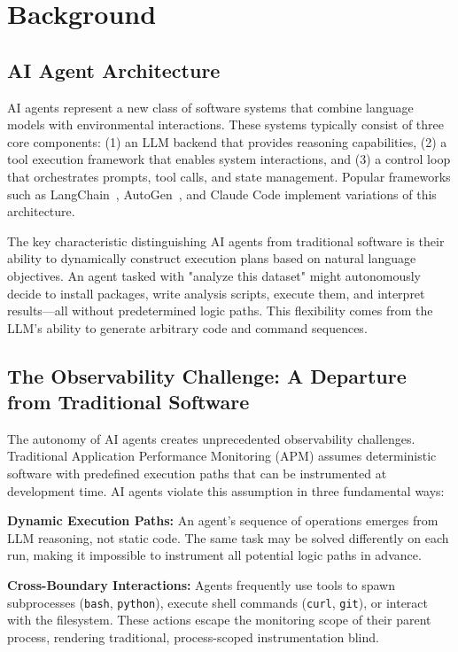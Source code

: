 \section{Background}

\subsection{AI Agent Architecture}

AI agents represent a new class of software systems that combine language models with environmental interactions. These systems typically consist of three core components: (1) an LLM backend that provides reasoning capabilities, (2) a tool execution framework that enables system interactions, and (3) a control loop that orchestrates prompts, tool calls, and state management. Popular frameworks such as LangChain~\cite{langchain}, AutoGen~\cite{autogen}, and Claude Code implement variations of this architecture.

The key characteristic distinguishing AI agents from traditional software is their ability to dynamically construct execution plans based on natural language objectives. An agent tasked with "analyze this dataset" might autonomously decide to install packages, write analysis scripts, execute them, and interpret results—all without predetermined logic paths. This flexibility comes from the LLM's ability to generate arbitrary code and command sequences.

\subsection{The Observability Challenge: A Departure from Traditional Software}

The autonomy of AI agents creates unprecedented observability challenges. Traditional Application Performance Monitoring (APM) assumes deterministic software with predefined execution paths that can be instrumented at development time. AI agents violate this assumption in three fundamental ways:

\textbf{Dynamic Execution Paths:} An agent's sequence of operations emerges from LLM reasoning, not static code. The same task may be solved differently on each run, making it impossible to instrument all potential logic paths in advance.

\textbf{Cross-Boundary Interactions:} Agents frequently use tools to spawn subprocesses (\texttt{bash}, \texttt{python}), execute shell commands (\texttt{curl}, \texttt{git}), or interact with the filesystem. These actions escape the monitoring scope of their parent process, rendering traditional, process-scoped instrumentation blind.


